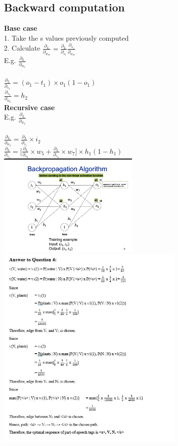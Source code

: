 \documentclass[11pt]{article}
\begin{document}
\begin{multicols*}{4}
\subsection*{Backward computation}
\textbf{Base case}\\
1. Take the s values previously computed \\
2. Calculate $\frac{\partial_{L}}{\partial_{w_{m}}} =  \frac{\partial_{L}}{\partial_{s_{1}}}\frac{\partial_{s_{1}}}{\partial_{w_{m}}}$\\
	E.g. $\frac{\partial_{L}}{\partial_{w_{6}}}$\\
	\\$\frac{\partial_{L}}{\partial_{s_{3}}}= (o_{1} - t_{1}) \times o_{1}(1 - o_{1})$\\
$\frac{\partial_{s_{3}}}{\partial_{w_{6}}} = h_{2}$\\
\textbf{Recursive case}\\
E.g. $\frac{\partial_{L}}{\partial_{w_{2}}}$\\
\\$\frac{\partial_{L}}{\partial_{w_{2}}}= \frac{\partial_{L}}{\partial_{s_{1}}} \times i_{2}$\\
$\frac{\partial_{L}}{\partial_{s_{1}}} = \big[\frac{\partial_{L}}{\partial_{s_{3}}} \times w_{5} + \frac{\partial_{L}}{\partial_{s_{4}}} \times w_{7} \big] \times h_{1}(1 - h_{1})$\\
\includegraphics[height=5cm]{images/b}\\
\includegraphics[height=10cm]{images/ver}

\end{multicols*}
\end{document}
